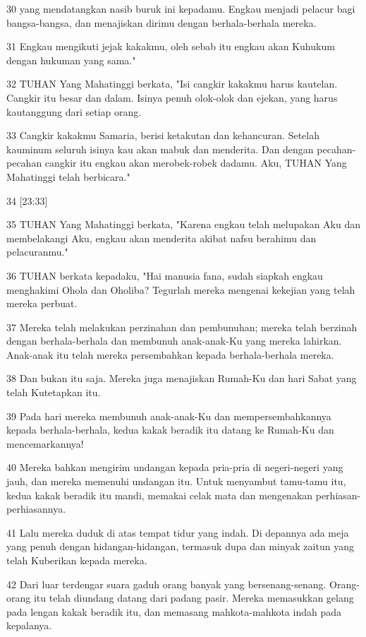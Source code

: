 \par 30 yang mendatangkan nasib buruk ini kepadamu. Engkau menjadi pelacur bagi bangsa-bangsa, dan menajiskan dirimu dengan berhala-berhala mereka.
\par 31 Engkau mengikuti jejak kakakmu, oleh sebab itu engkau akan Kuhukum dengan hukuman yang sama."
\par 32 TUHAN Yang Mahatinggi berkata, "Isi cangkir kakakmu harus kautelan. Cangkir itu besar dan dalam. Isinya penuh olok-olok dan ejekan, yang harus kautanggung dari setiap orang.
\par 33 Cangkir kakakmu Samaria, berisi ketakutan dan kehancuran. Setelah kauminum seluruh isinya kau akan mabuk dan menderita. Dan dengan pecahan-pecahan cangkir itu engkau akan merobek-robek dadamu. Aku, TUHAN Yang Mahatinggi telah berbicara."
\par 34 [23:33]
\par 35 TUHAN Yang Mahatinggi berkata, "Karena engkau telah melupakan Aku dan membelakangi Aku, engkau akan menderita akibat nafsu berahimu dan pelacuranmu."
\par 36 TUHAN berkata kepadaku, "Hai manusia fana, sudah siapkah engkau menghakimi Ohola dan Oholiba? Tegurlah mereka mengenai kekejian yang telah mereka perbuat.
\par 37 Mereka telah melakukan perzinahan dan pembunuhan; mereka telah berzinah dengan berhala-berhala dan membunuh anak-anak-Ku yang mereka lahirkan. Anak-anak itu telah mereka persembahkan kepada berhala-berhala mereka.
\par 38 Dan bukan itu saja. Mereka juga menajiskan Rumah-Ku dan hari Sabat yang telah Kutetapkan itu.
\par 39 Pada hari mereka membunuh anak-anak-Ku dan mempersembahkannya kepada berhala-berhala, kedua kakak beradik itu datang ke Rumah-Ku dan mencemarkannya!
\par 40 Mereka bahkan mengirim undangan kepada pria-pria di negeri-negeri yang jauh, dan mereka memenuhi undangan itu. Untuk menyambut tamu-tamu itu, kedua kakak beradik itu mandi, memakai celak mata dan mengenakan perhiasan-perhiasannya.
\par 41 Lalu mereka duduk di atas tempat tidur yang indah. Di depannya ada meja yang penuh dengan hidangan-hidangan, termasuk dupa dan minyak zaitun yang telah Kuberikan kepada mereka.
\par 42 Dari luar terdengar suara gaduh orang banyak yang bersenang-senang. Orang-orang itu telah diundang datang dari padang pasir. Mereka memasukkan gelang pada lengan kakak beradik itu, dan memasang mahkota-mahkota indah pada kepalanya.
